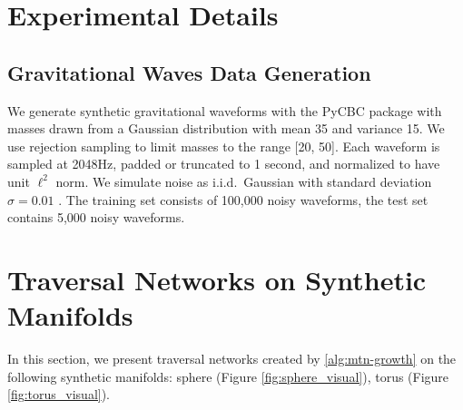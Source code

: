 \newpage 












\section{Experimental Details}

\subsection{Gravitational Waves Data Generation} \label{sec:data_generation}

We generate synthetic gravitational waveforms with the PyCBC package \cite{nitz2023gwastro} with masses drawn from a Gaussian distribution with mean 35 and variance 15. We use rejection sampling to limit masses to the range [20, 50]. Each waveform is sampled at 2048Hz, padded or truncated to 1 second, and normalized to have unit $\ell^2$ norm. We simulate noise as i.i.d.\ Gaussian with standard deviation $\sigma = 0.01$ \cite{yan2023tpopt}. The training set consists of 100,000 noisy waveforms, the test set contains 5,000 noisy waveforms.





\section{Traversal Networks on Synthetic Manifolds} \label{sec:manifold_vis}

In this section, we present traversal networks created by \cref{alg:mtn-growth} on the following synthetic manifolds: sphere (Figure \ref{fig:sphere_visual}), torus (Figure \ref{fig:torus_visual}).

